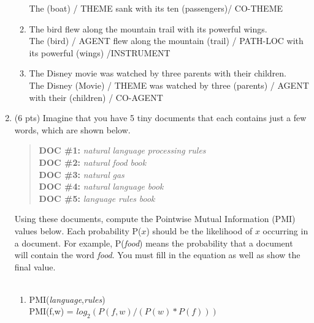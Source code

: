 \documentclass[11pt]{article}
\begin{document}
\begin{enumerate}
\begin{enumerate}
The (boat) / {THEME} sank with its ten (passengers)/ {CO-THEME} \\

\item The bird flew along the mountain trail with its powerful
  wings. \\ 
  
  The (bird) / {AGENT} flew along the mountain (trail) / {PATH-LOC} with its powerful (wings) /{INSTRUMENT} \\

\item The Disney movie was watched by three parents with their
  children. \\ 
  
  The Disney (Movie) / {THEME} was watched by three (parents) / {AGENT} with their (children) / {CO-AGENT} \\

\end{enumerate}


\item (6 pts) Imagine that you have 5 tiny documents that each
  contains just a few words, which are shown below. 

\begin{quote}
\textbf{DOC \#1:} {\it natural} {\it language} {\it processing} {\it rules} \\
\textbf{DOC \#2:} {\it natural} {\it food} {\it book} \\
\textbf{DOC \#3:} {\it natural} {\it gas} \\
\textbf{DOC \#4:} {\it natural} {\it language} {\it book} \\
\textbf{DOC \#5:} {\it language} {\it rules} {\it book}
\end{quote}

Using these documents, compute the Pointwise Mutual
Information (PMI) values below. Each probability P($x$) should be the likelihood of
$x$ occurring in a document. For example, P({\it food}) means the probability
that a document will contain the word {\it food}. You must fill in the
equation as well as show the final value.  \\ ~ \\

\begin{enumerate}
\item PMI({\it language},{\it rules}) \\ 
PMI(f,w) = $log_2 (P(f,w) / (P(w)*P(f))) $\\


\end{enumerate}
\end{enumerate}
\end{document}
